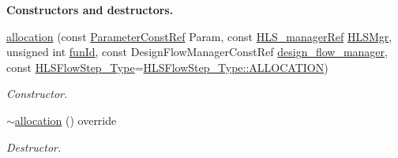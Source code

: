 \begin{Indent}\textbf{ Constructors and destructors.}\par
\begin{DoxyCompactItemize}
\item 
\hyperlink{classallocation_a28d6121ea2736ac049f433e367683575}{allocation} (const \hyperlink{Parameter_8hpp_a37841774a6fcb479b597fdf8955eb4ea}{Parameter\+Const\+Ref} Param, const \hyperlink{hls__manager_8hpp_acd3842b8589fe52c08fc0b2fcc813bfe}{H\+L\+S\+\_\+manager\+Ref} \hyperlink{classHLS__step_ade85003a99d34134418451ddc46a18e9}{H\+L\+S\+Mgr}, unsigned int \hyperlink{classHLSFunctionStep_a3e6434fd86c698b0c70520b859bff5b0}{fun\+Id}, const Design\+Flow\+Manager\+Const\+Ref \hyperlink{classDesignFlowStep_ab770677ddf087613add30024e16a5554}{design\+\_\+flow\+\_\+manager}, const \hyperlink{hls__step_8hpp_ada16bc22905016180e26fc7e39537f8d}{H\+L\+S\+Flow\+Step\+\_\+\+Type}=\hyperlink{hls__step_8hpp_ada16bc22905016180e26fc7e39537f8daf3ade60018a383ba297f423fa621528e}{H\+L\+S\+Flow\+Step\+\_\+\+Type\+::\+A\+L\+L\+O\+C\+A\+T\+I\+ON})
\begin{DoxyCompactList}\small\item\em Constructor. \end{DoxyCompactList}\item 
\hyperlink{classallocation_a6582d417d60e3e09b82147b48004b285}{$\sim$allocation} () override
\begin{DoxyCompactList}\small\item\em Destructor. \end{DoxyCompactList}\end{DoxyCompactItemize}
\end{Indent}
